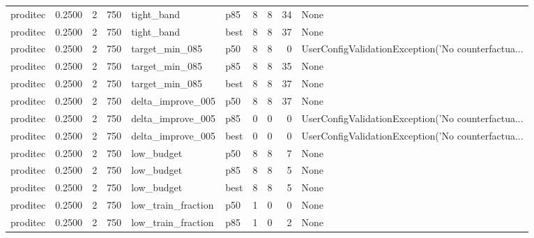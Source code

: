 \begin{tabular}{lrrrllrrrl}
proditec &    0.2500 &    2 &    750 &           tight\_band &    p85 &               8 &          8 &      34 &                                               None \\
proditec &    0.2500 &    2 &    750 &           tight\_band &   best &               8 &          8 &      37 &                                               None \\
proditec &    0.2500 &    2 &    750 &       target\_min\_085 &    p50 &               8 &          8 &       0 & UserConfigValidationException('No counterfactua... \\
proditec &    0.2500 &    2 &    750 &       target\_min\_085 &    p85 &               8 &          8 &      35 &                                               None \\
proditec &    0.2500 &    2 &    750 &       target\_min\_085 &   best &               8 &          8 &      37 &                                               None \\
proditec &    0.2500 &    2 &    750 &    delta\_improve\_005 &    p50 &               8 &          8 &      37 &                                               None \\
proditec &    0.2500 &    2 &    750 &    delta\_improve\_005 &    p85 &               0 &          0 &       0 & UserConfigValidationException('No counterfactua... \\
proditec &    0.2500 &    2 &    750 &    delta\_improve\_005 &   best &               0 &          0 &       0 & UserConfigValidationException('No counterfactua... \\
proditec &    0.2500 &    2 &    750 &           low\_budget &    p50 &               8 &          8 &       7 &                                               None \\
proditec &    0.2500 &    2 &    750 &           low\_budget &    p85 &               8 &          8 &       5 &                                               None \\
proditec &    0.2500 &    2 &    750 &           low\_budget &   best &               8 &          8 &       5 &                                               None \\
proditec &    0.2500 &    2 &    750 &   low\_train\_fraction &    p50 &               1 &          0 &       0 &                                               None \\
proditec &    0.2500 &    2 &    750 &   low\_train\_fraction &    p85 &               1 &          0 &       2 &                                               None \\

\end{tabular}
